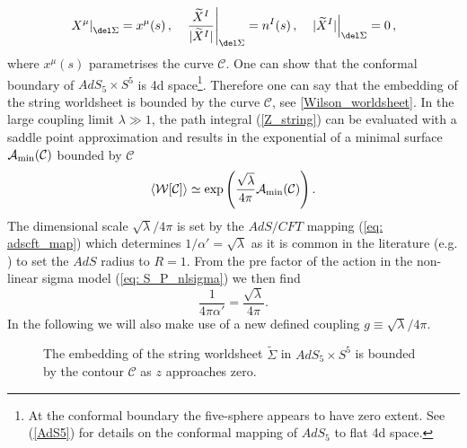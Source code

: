 %
%
\begin{equation}
\left. X^{\mu} \right\vert_{\del \Sigma} = x^{\mu}(s) \,,\quad   \left.\frac{\widetilde{X}^{I}}{\vert \widetilde{X}^{I}\vert} \right\vert_{\del \Sigma} = n^{I}(s) \,, \quad   \left. \vert \widetilde{X}^{I} \vert \right\vert_{\del \Sigma} = 0\,,
\end{equation}
%
%
where $x^{\mu}(s)$ parametrises the curve $\mathcal{C}$. One can show that the conformal boundary of $AdS_{5}\times S^{5}$ is 4d  space\footnote{At the conformal boundary the five-sphere appears to have zero extent. See (\ref{AdS5}) for details on the conformal mapping of $AdS_{5}$ to flat 4d  space.}. Therefore one can say that the embedding of the string worldsheet is bounded by the curve $\mathcal{C}$, see \autoref{Wilson_worldsheet}. In the large  coupling limit $\lambda \gg 1$, the path integral (\ref{Z_string}) can be evaluated with a saddle point approximation and results in the exponential of a minimal surface $\mathcal{A}_{\rm min}(\mathcal{C})$ bounded by $\mathcal{C}$
%
%
\begin{equation}
\langle \mathcal{W}[\mathcal{C}]\rangle \simeq \exp \left( \frac{\sqrt{\lambda}}{4\pi} \mathcal{A}_{\rm min}(\mathcal{C}) \right).
\end{equation}
The dimensional scale $\sqrt{\lambda}/4\pi$ is set by the $AdS/CFT$ mapping (\ref{eq: adscft_map}) which determines $1/\alpha'=\sqrt{\lambda}$ as it is common in the literature (e.g. \cite{Giombi:2009gd}) to set the $AdS$ radius to $R=1$. From the pre factor of the action in the non-linear sigma model (\ref{eq: S_P_nlsigma}) we then find
%
%
\begin{equation}
\frac{1}{4\pi\alpha'} = \frac{\sqrt{\lambda}}{4\pi}.
\end{equation}
%
%
In the following we will also make use of a new defined coupling $g\equiv \sqrt{\lambda}/4\pi$.
%
%
\begin{figure}
\begin{center}
\caption{The embedding of the string worldsheet $\widetilde{\Sigma}$ in $AdS_{5}\times S^{5}$ is bounded by the contour $\mathcal{C}$ as $z$ approaches zero.\label{Wilson_worldsheet}}
\end{center}
\end{figure}
%
%
%
%
%
%
%
